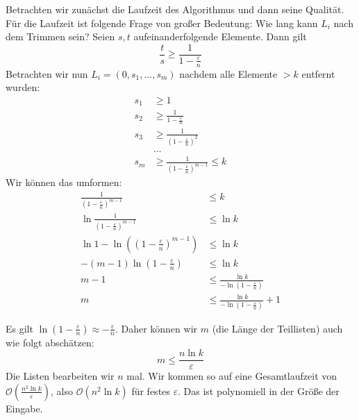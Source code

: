 \begin{Bew}
  \hspace{\parindent}Betrachten wir zunächst die Laufzeit des Algorithmus und dann seine Qualität. Für die Laufzeit ist folgende Frage von großer Bedeutung: Wie lang kann $L_i$ nach dem Trimmen sein? Seien $s,t$ aufeinanderfolgende Elemente. Dann gilt %
  \[ \frac{t}{s} \ge \frac{1}{1-\frac{\varepsilon}{n}} \]
  Betrachten wir nun $L_i = (0, s_1, \ldots, s_m)$ nachdem alle Elemente $>k$ entfernt wurden:
  \begin{align*}
    s_1 & \ge 1\\
    s_2 &\ge \frac{1}{1-\frac{\varepsilon}{n}} \\
    s_3 &\ge \frac{1}{(1- \frac{\varepsilon}{n})^2}\\
    & \ldots\\
    s_m &\ge \frac{1}{(1- \frac{\varepsilon}{n})^{m-1}} \le k
  \end{align*}
  Wir können das umformen:
  \begin{align*}
    \frac{1}{(1- \frac{\varepsilon}{n})^{m-1}} &\le k\\
    \ln \frac{1}{(1- \frac{\varepsilon}{n})^{m-1}} & \le \ln k\\
    \ln 1 - \ln ((1-\frac{\varepsilon}{n})^{m-1}) & \le \ln k\\
    -(m-1) \ln (1-\frac{\varepsilon}{n}) &\le \ln k\\
    m - 1 & \le \frac{\ln k}{-\ln (1-\frac{\varepsilon}{n})} \\
    m & \le \frac{\ln k}{-\ln (1-\frac{\varepsilon}{n})} + 1
  \end{align*}
  
  Es gilt $\ln (1- \frac{\varepsilon}{n}) \approx -\frac{\varepsilon}{n}$. Daher können wir $m$ (die Länge der Teillisten) auch wie folgt abschätzen:
  \[ m \le \frac{n \ln k}{\varepsilon} \]
  Die Listen bearbeiten wir $n$ mal. Wir kommen so auf eine Gesamtlaufzeit von $\mathcal{O}(\frac{n^2 \ln k}{\varepsilon})$, also $\mathcal{O}(n^2 \ln k)$ für festes $\varepsilon$. Das ist polynomiell in der Größe der Eingabe.
  
%  
%  
%  
%  
\end{Bew}

